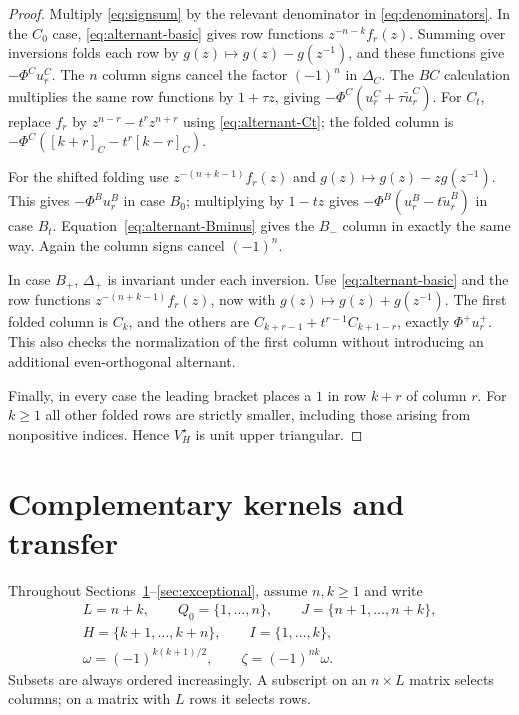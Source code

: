 \documentclass[12pt]{article}
\numberwithin{equation}{section}
\begin{document}
\begin{proof}
Multiply \eqref{eq:signsum} by the relevant denominator in
\eqref{eq:denominators}.  In the $C_0$ case,
\eqref{eq:alternant-basic} gives row functions
$z^{-n-k}f_r(z)$.  Summing over inversions folds each row by
$g(z)\mapsto g(z)-g(z^{-1})$, and these functions give
$-\Phi^C u_r^C$.  The $n$ column signs cancel the factor $(-1)^n$
in $\Delta_C$.  The $BC$ calculation multiplies the same row
functions by $1+\tau z$, giving
$-\Phi^C(u_r^C+\tau\widetilde u_r^C)$.
For $C_t$, replace $f_r$ by $z^{n-r}-t^rz^{n+r}$ using
\eqref{eq:alternant-Ct}; the folded column is
$-\Phi^C([k+r]_C-t^r[k-r]_C)$.

For the shifted folding use $z^{-(n+k-1)}f_r(z)$ and
$g(z)\mapsto g(z)-zg(z^{-1})$.  This gives
$-\Phi^B u_r^B$ in case $B_0$; multiplying by $1-tz$ gives
$-\Phi^B(u_r^B-t\widetilde u_r^B)$ in case $B_t$.
Equation~\eqref{eq:alternant-Bminus} gives the $B_-$ column in
exactly the same way.  Again the column signs cancel $(-1)^n$.

In case $B_+$, $\Delta_+$ is invariant under each inversion.
Use \eqref{eq:alternant-basic} and the row functions
$z^{-(n+k-1)}f_r(z)$, now with
$g(z)\mapsto g(z)+g(z^{-1})$.  The first folded column is $C_k$,
and the others are
$C_{k+r-1}+t^{r-1}C_{k+1-r}$, exactly $\Phi^+u_r^+$.
This also checks the normalization of the first column without
introducing an additional even-orthogonal alternant.

Finally, in every case the leading bracket places a $1$ in row $k+r$
of column $r$.  For $k\ge1$ all other folded rows are strictly
smaller, including those arising from nonpositive indices.  Hence
$V^\star_H$ is unit upper triangular.
\end{proof}


\section{Complementary kernels and transfer}\label{sec:transfer}

Throughout Sections~\ref{sec:transfer}--\ref{sec:exceptional}, assume
$n,k\ge1$ and write
\[
\begin{gathered}
 L=n+k,\qquad Q_0=\{1,\ldots,n\},\qquad J=\{n+1,\ldots,n+k\},\\
 H=\{k+1,\ldots,k+n\},\qquad I=\{1,\ldots,k\},\\
 \omega=(-1)^{k(k+1)/2},\qquad \zeta=(-1)^{nk}\omega.
\end{gathered}
\]
Subsets are always ordered increasingly.  A subscript on an
$n\times L$ matrix selects columns; on a matrix with $L$ rows it
selects rows.
\end{document}
